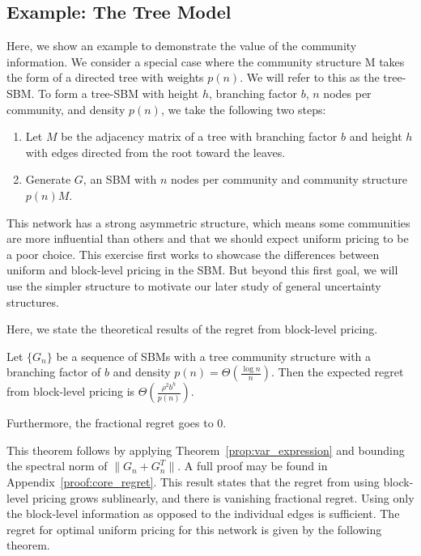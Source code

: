\subsection{Example: The Tree Model}
Here, we show an example to demonstrate the value of the community information. We consider a special case where the community structure M takes the form of a directed tree with weights $p(n)$. We will refer to this as the tree-SBM\@. To form a tree-SBM with height $h$, branching factor $b$, $n$ nodes per community, and density $p(n)$, we take the following two steps:
\begin{enumerate}
    \item Let $M$ be the adjacency matrix of a tree with branching factor $b$ and height $h$ with edges directed from the root toward the leaves. 
    \item Generate $G$, an SBM with $n$ nodes per community and community structure $p(n) M$.
\end{enumerate}


This network has a strong asymmetric structure, which means some communities are more influential than others and that we should expect uniform pricing to be a poor choice. This exercise first works to showcase the differences between uniform and block-level pricing in the SBM\@. But beyond this first goal, we will use the simpler structure to motivate our later study of general uncertainty structures.

Here, we state the theoretical results of the regret from block-level pricing. 

\begin{theorem}\label{thm:core_regret}
    Let $\{G_n\}$ be a sequence of SBMs with a tree community structure with a branching factor of $b$ and density $p(n) = \Theta( \frac{\log n}{n})$. Then the expected regret from block-level pricing is $\Theta\left(\frac{\rho^2 b^{h}}{ p(n)}\right)$.

    Furthermore, the fractional regret goes to $0$.
\end{theorem}

This theorem follows by applying Theorem~\ref{prop:var_expression} and bounding the spectral norm of $\|G_n +G_n^T\|$. A full proof may be found in Appendix~\ref{proof:core_regret}. This result states that the regret from using block-level pricing grows sublinearly, and there is vanishing fractional regret. Using only the block-level information as opposed to the individual edges is sufficient. The regret for optimal uniform pricing for this network is given by the following theorem.

